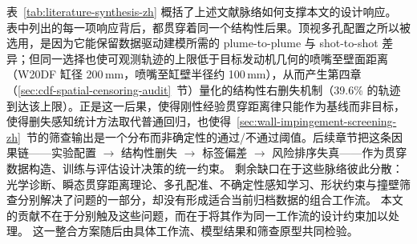 表~\ref{tab:literature-synthesis-zh} 概括了上述文献脉络如何支撑本文的设计响应。
表中列出的每一项响应背后，都贯穿着同一个结构性后果。顶视多孔配置之所以被选用，是因为它能保留数据驱动建模所需的 plume-to-plume 与 shot-to-shot 差异；但同一选择也使可观测轨迹的上限低于目标发动机几何的喷嘴至壁面距离（W20DF 缸径 200\,mm，喷嘴至缸壁半径约 100\,mm），从而产生第四章（\ref{sec:cdf-spatial-censoring-audit}~节）量化的结构性右删失机制（39.6\% 的轨迹到达该上限）。正是这一后果，使得刚性经验贯穿距离律只能作为基线而非目标，使得删失感知统计方法取代普通回归，也使得~\ref{sec:wall-impingement-screening-zh}~节的筛查输出是一个分布而非确定性的通过/不通过阈值。后续章节把这条因果链——实验配置 $\to$ 结构性删失 $\to$ 标签偏差 $\to$ 风险排序失真——作为贯穿数据构造、训练与评估设计决策的统一约束。
剩余缺口在于这些脉络彼此分散：光学诊断、瞬态贯穿距离理论、多孔配准、不确定性感知学习、形状约束与撞壁筛查分别解决了问题的一部分，却没有形成适合当前归档数据的组合工作流。
本文的贡献不在于分别触及这些问题，而在于将其作为同一工作流的设计约束加以处理。
这一整合方案随后由具体工作流、模型结果和筛查原型共同检验。
